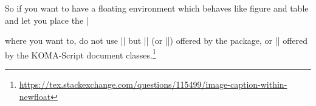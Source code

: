So if you want to have a floating environment which behaves like figure and table and let you place the |\caption| where you want to, do not use |\newfloat| but |\DeclareFloatingEnvironment| (or |\DeclareCaptionType|) offered by the  package, or |\DeclareNewTOC| offered by the KOMA-Script document classes.\footnote{
\protect\url{https://tex.stackexchange.com/questions/115499/image-caption-within-newfloat}}


\endinput

\floatstyle{ruled}
\newfloat{Example}{htbp}{loe}[chapter]

 \begin{Example}
 \begin{verbatim}
   \begin{Photo}
      \centering
      \texttt{[image: ./graphics/level3.jpg]}
      \caption{. . . caption . . . }
   \end{Photo}
\end{verbatim}
\caption{Example using verbatim code}
 \end{Example}

\begin{Photo}
 \centering
 \texttt{[image: ./images/old-timer-structural-worker.jpg]}
\caption{. . . caption . . . }
\end{Photo}


                                             
\begin{plate}[h]
\caption{This is a plate}
 \end{plate}                                             


\begin{painting}[h]
\caption{This is a plate}
 \end{painting} 

